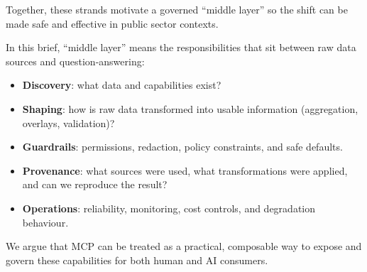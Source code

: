 \noindent Together, these strands motivate a governed ``middle layer'' so the shift can be made safe and effective in public sector contexts. \cite{data_ai_ethics_framework,ncsc_secure_ai_guidelines}

In this brief, ``middle layer'' means the responsibilities that sit between raw data sources and question-answering:
\begin{itemize}[leftmargin=*]
  \item \textbf{Discovery}: what data and capabilities exist?
  \item \textbf{Shaping}: how is raw data transformed into usable information (aggregation, overlays, validation)?
  \item \textbf{Guardrails}: permissions, redaction, policy constraints, and safe defaults.
  \item \textbf{Provenance}: what sources were used, what transformations were applied, and can we reproduce the result?
  \item \textbf{Operations}: reliability, monitoring, cost controls, and degradation behaviour.
\end{itemize}

We argue that MCP can be treated as a practical, composable way to expose and govern these capabilities for both human and AI consumers.
\cite{mcp_spec_2025_11_25,prov_dm,nist_ai_rmf10,data_ai_ethics_framework,algorithmic_transparency_recording_standard}

